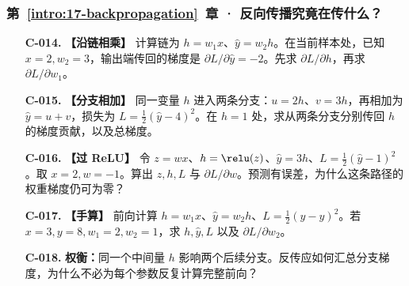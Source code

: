 \subsubsection*{第~\ref*{intro:17-backpropagation}~章 · 反向传播究竟在传什么？}
\begin{enumerate}[label={},leftmargin=4.8em,itemsep=4pt]
\item[\textbf{C-014.}] \leavevmode{}\label{exercise:C-014}\label{exercise:local-chain-gradient}\textbf{【沿链相乘】} 计算链为 $h=w_1x$、$\widehat{y}=w_2h$。在当前样本处，已知 $x=2,w_2=3$，输出端传回的梯度是 $\partial L/\partial\widehat{y}=-2$。先求 $\partial L/\partial h$，再求 $\partial L/\partial w_1$。
\item[\textbf{C-015.}] \leavevmode{}\label{exercise:C-015}\label{exercise:branch-gradient-sum}\textbf{【分支相加】} 同一变量 $h$ 进入两条分支：$u=2h$、$v=3h$，再相加为 $\widehat{y}=u+v$，损失为 $L=\tfrac12(\widehat{y}-4)^2$。在 $h=1$ 处，求从两条分支分别传回 $h$ 的梯度贡献，以及总梯度。
\item[\textbf{C-016.}] \leavevmode{}\label{exercise:C-016}\label{exercise:relu-blocked-gradient}\textbf{【过 ReLU】} 令 $z=wx$、$h=\relu(z)$、$\widehat{y}=3h$、$L=\tfrac12(\widehat{y}-1)^2$。取 $x=2,w=-1$。算出 $z,h,L$ 与 $\partial L/\partial w$。预测有误差，为什么这条路径的权重梯度仍可为零？
\item[\textbf{C-017.}] \leavevmode{}\label{exercise:C-017}\label{exercise:scalar-chain-forward}\label{exercise:linked-17-backpropagation}  \textbf{【手算】} 前向计算 $h=w_1x$、$\widehat{y}=w_2h$、$L=\tfrac12(\widehat{y}-y)^2$。若 $x=3,y=8,w_1=2,w_2=1$，求 $h,\widehat{y},L$ 以及 $\partial L/\partial w_2$。
\item[\textbf{C-018.}] \leavevmode{}\label{exercise:C-018}\label{exercise:branch-gradient-reuse}\textbf{权衡：}同一个中间量 $h$ 影响两个后续分支。反传应如何汇总分支梯度，为什么不必为每个参数反复计算完整前向？
\end{enumerate}
